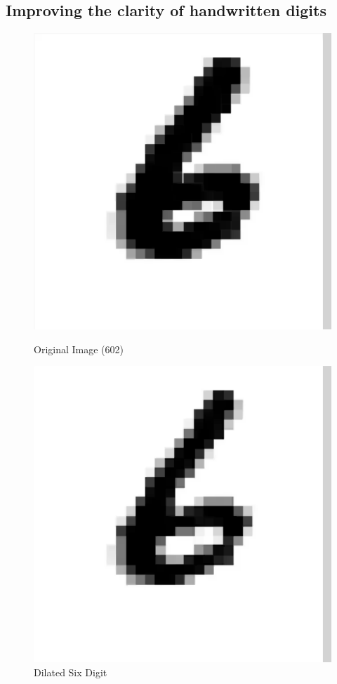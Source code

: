 \documentclass{article}
\begin{document}
\subsection{Improving the clarity of handwritten digits}
\vspace{6mm}
\begin{figure}[ht!]
  \begin{minipage}[b]{0.5\linewidth}
    \centering
    \includegraphics[width=.95\linewidth]{six.png} 
    \caption{Original Image 
    \small(602)} 
    \vspace{4ex}
  \end{minipage}%
  \begin{minipage}[b]{0.5\linewidth}
    \centering
    \includegraphics[width=.95\linewidth]{dilated_six.png} 
    \caption{Dilated Six Digit} 
    \vspace{4ex}
  \end{minipage} 
\end{figure}
\end{document}

